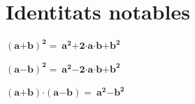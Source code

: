 \section{Identitats notables}


\begin{theorybox}
	
	
	   ${\left(\boldsymbol{a}\boldsymbol{+}\boldsymbol{b}\right)}^{\boldsymbol{2}}\boldsymbol{=\ }{\boldsymbol{a}}^{\boldsymbol{2}}\boldsymbol{+}\boldsymbol{2}\boldsymbol{\textrm{·}}\boldsymbol{a}\boldsymbol{\textrm{·}}\boldsymbol{b}\boldsymbol{+}{\boldsymbol{b}}^{\boldsymbol{2}}$ 
	
	   ${\left(\boldsymbol{a}\boldsymbol{-}\boldsymbol{b}\right)}^{\boldsymbol{2}}\boldsymbol{=\ }{\boldsymbol{a}}^{\boldsymbol{2}}\boldsymbol{-}\boldsymbol{2}\boldsymbol{\textrm{·}}\boldsymbol{a}\boldsymbol{\textrm{·}}\boldsymbol{b}\boldsymbol{+}{\boldsymbol{b}}^{\boldsymbol{2}}$       
	
	 $\left(\boldsymbol{a}\boldsymbol{+}\boldsymbol{b}\right)\boldsymbol{\textrm{·}}\left(\boldsymbol{a}\boldsymbol{-}\boldsymbol{b}\right)\boldsymbol{=\ }{\boldsymbol{a}}^{\boldsymbol{2}}\boldsymbol{-}{\boldsymbol{b}}^{\boldsymbol{2}}$
	\vspace{0.5cm}
\end{theorybox}

